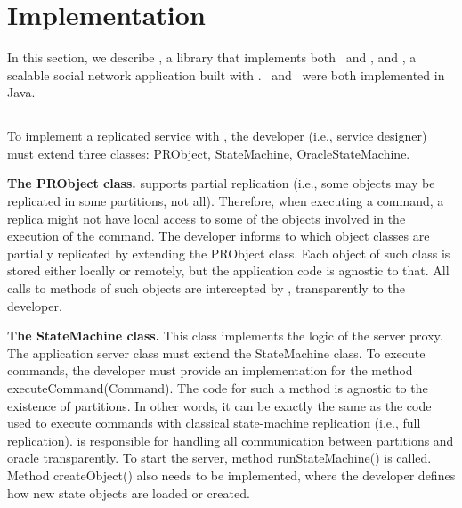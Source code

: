 \section{Implementation}
\label{sec:implementation}

In this section, we describe \libname{}, a library that implements both \ssmr\ and \dssmr{}, and \appname{}, a scalable social network application built with \libname{}. \libname\ and \appname\ were both implemented in Java.

\subsection{\libname}

To implement a replicated service with \libname{}, the developer (i.e., service designer) must extend three classes: PRObject, StateMachine, OracleStateMachine.

\textbf{The PRObject class.} \libname{} supports partial replication (i.e., some objects may be replicated in some partitions, not all). Therefore, when executing a command, a replica might not have local access to some of the objects involved in the execution of the command. The developer informs to \libname{} which object classes are partially replicated by extending the PRObject class. Each object of such class is stored either locally or remotely, but the application code is agnostic to that. All calls to methods of such objects are intercepted by \appname{}, transparently to the developer.


\textbf{The StateMachine class.} This class implements the logic of the server proxy. The application server class must extend the StateMachine class. To execute commands, the developer must provide an implementation for the method executeCommand(Command). The code for such a method is agnostic to the existence of partitions. In other words, it can be exactly the same as the code used to execute commands with classical state-machine replication (i.e., full replication). \libname{} is responsible for handling all communication between partitions and oracle transparently. To start the server, method runStateMachine() is called. Method createObject() also needs to be implemented, where the developer defines how new state objects are loaded or created.

